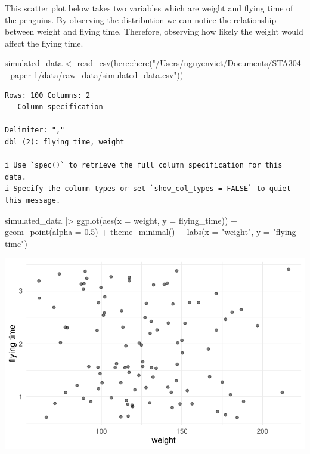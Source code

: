 \documentclass[
  letterpaper,
  DIV=11,
  numbers=noendperiod]{scrartcl}
\newenvironment{Shaded}{\begin{snugshade}}{\end{snugshade}}
\newcommand{\AttributeTok}[1]{\textcolor[rgb]{0.40,0.45,0.13}{#1}}
\newcommand{\FloatTok}[1]{\textcolor[rgb]{0.68,0.00,0.00}{#1}}
\newcommand{\FunctionTok}[1]{\textcolor[rgb]{0.28,0.35,0.67}{#1}}
\newcommand{\NormalTok}[1]{\textcolor[rgb]{0.00,0.23,0.31}{#1}}
\newcommand{\OtherTok}[1]{\textcolor[rgb]{0.00,0.23,0.31}{#1}}
\newcommand{\SpecialCharTok}[1]{\textcolor[rgb]{0.37,0.37,0.37}{#1}}
\newcommand{\StringTok}[1]{\textcolor[rgb]{0.13,0.47,0.30}{#1}}
\begin{document}
This scatter plot below takes two variables which are weight and flying
time of the penguins. By observing the distribution we can notice the
relationship between weight and flying time. Therefore, observing how
likely the weight would affect the flying time.

\begin{Shaded}
\begin{Highlighting}[]
\NormalTok{simulated\_data }\OtherTok{\textless{}{-}} \FunctionTok{read\_csv}\NormalTok{(here}\SpecialCharTok{::}\FunctionTok{here}\NormalTok{(}\StringTok{"/Users/nguyenviet/Documents/STA304 {-} paper 1/data/raw\_data/simulated\_data.csv"}\NormalTok{))}
\end{Highlighting}
\end{Shaded}

\begin{verbatim}
Rows: 100 Columns: 2
-- Column specification --------------------------------------------------------
Delimiter: ","
dbl (2): flying_time, weight

i Use `spec()` to retrieve the full column specification for this data.
i Specify the column types or set `show_col_types = FALSE` to quiet this message.
\end{verbatim}

\begin{Shaded}
\begin{Highlighting}[]
\NormalTok{simulated\_data }\SpecialCharTok{|\textgreater{}}
  \FunctionTok{ggplot}\NormalTok{(}\FunctionTok{aes}\NormalTok{(}\AttributeTok{x =}\NormalTok{ weight, }\AttributeTok{y =}\NormalTok{ flying\_time)) }\SpecialCharTok{+}
  \FunctionTok{geom\_point}\NormalTok{(}\AttributeTok{alpha =} \FloatTok{0.5}\NormalTok{) }\SpecialCharTok{+}
  \FunctionTok{theme\_minimal}\NormalTok{() }\SpecialCharTok{+}
  \FunctionTok{labs}\NormalTok{(}\AttributeTok{x =} \StringTok{"weight"}\NormalTok{, }\AttributeTok{y =} \StringTok{"flying time"}\NormalTok{)}
\end{Highlighting}
\end{Shaded}

\includegraphics{paper_files/figure-pdf/unnamed-chunk-4-1.pdf}
\end{document}
